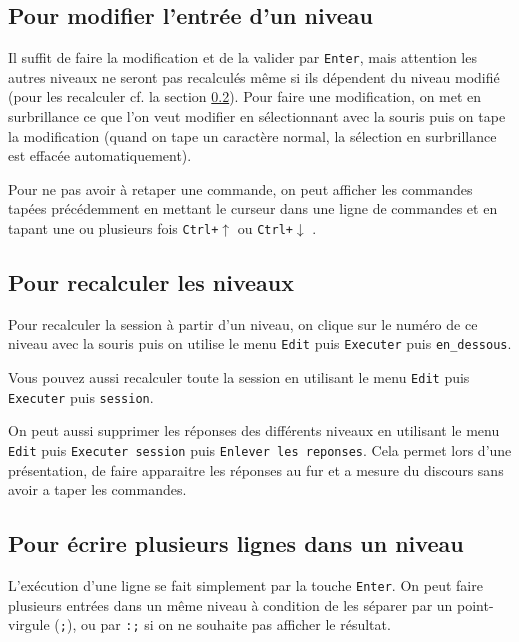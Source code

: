 \documentclass[a4paper,11pt]{article}
\begin{document}
\subsection{Pour modifier l'entr\'ee d'un niveau}
Il suffit de faire la modification et de la valider par {\tt Enter},
mais attention les autres niveaux ne seront pas recalcul\'es m\^eme si ils 
d\'ependent du niveau modifi\'e (pour les recalculer
cf. la section \ref{sec:recalculer}). Pour faire une modification, on met
en surbrillance ce que l'on veut modifier en s\'electionnant avec la souris
puis on tape la modification (quand on tape un caract\`ere normal,
la s\'election en surbrillance est effac\'ee automatiquement).

Pour ne pas avoir \`a retaper une commande, on peut afficher les commandes 
tap\'ees pr\'ec\'edemment en mettant le curseur dans une ligne de commandes et
en tapant une ou plusieurs fois {\tt Ctrl+$\uparrow$} ou 
{\tt Ctrl+$\downarrow$} .

\subsection{Pour recalculer les niveaux} 
\label{sec:recalculer}
Pour recalculer la session \`a partir d'un niveau, on clique sur le
num\'ero de ce niveau avec la souris puis on utilise le menu {\tt Edit} puis 
{\tt Executer} puis {\tt en\_dessous}.

Vous pouvez aussi recalculer toute la session en utilisant le menu {\tt Edit} 
puis {\tt Executer} puis {\tt session}.

On peut aussi supprimer les r\'eponses des diff\'erents niveaux  en utilisant 
le menu {\tt Edit} puis {\tt Executer session} puis {\tt Enlever les reponses}.
Cela permet lors d'une pr\'esentation, de faire apparaitre les r\'eponses au 
fur et a mesure du discours sans avoir a taper les commandes.

\subsection{Pour \'ecrire plusieurs lignes dans un niveau}
L'ex\'ecution d'une ligne se fait simplement par la touche {\tt Enter}. 
On peut faire plusieurs entr\'ees dans un m\^eme niveau \`a condition de les
s\'eparer par un point-virgule ({\tt ;}), ou par  \verb|:;|
si on ne souhaite pas afficher le r\'esultat.
 
\end{document}
